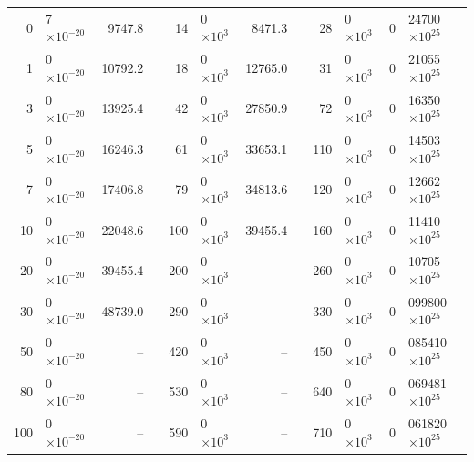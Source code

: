 \documentclass{warpdoc}
\begin{document}
\begin{table}
\begin{threeparttable}
\begin{tabular}{r@{.}lr@{}lr@{.}lr@{}lr@{.}lr@{.}l}
      0&7 $\times 10^{-20}$  &9747.8&  & 14&0 $\times 10^{3}$ &8471.3& & 28&0 $\times 10^{3}$ &  0&24700 $\times 10^{25}$\\
     1&0 $\times 10^{-20}$  &10792.2& & 18&0 $\times 10^{3}$ &12765.0& & 31&0 $\times 10^{3}$ &  0&21055 $\times 10^{25}$ \\
     3&0 $\times 10^{-20}$  &13925.4& & 42&0 $\times 10^{3}$ &27850.9& & 72&0 $\times 10^{3}$ &  0&16350 $\times 10^{25}$ \\
     5&0 $\times 10^{-20}$  &16246.3& & 61&0 $\times 10^{3}$ &33653.1& &110&0 $\times 10^{3}$ &  0&14503 $\times 10^{25}$ \\
     7&0 $\times 10^{-20}$  &17406.8& & 79&0 $\times 10^{3}$ &34813.6& &120&0 $\times 10^{3}$ &  0&12662 $\times 10^{25}$ \\
    10&0 $\times 10^{-20}$ &22048.6& &100&0 $\times 10^{3}$ &39455.4& &160&0 $\times 10^{3}$ &  0&11410 $\times 10^{25}$  \\
    20&0 $\times 10^{-20}$ &39455.4& &200&0 $\times 10^{3}$ &--& &260&0 $\times 10^{3}$ &  0&10705 $\times 10^{25}$  \\
    30&0 $\times 10^{-20}$ &48739.0& &290&0 $\times 10^{3}$ &--& &330&0 $\times 10^{3}$ &  0&099800 $\times 10^{25}$  \\
    50&0 $\times 10^{-20}$ &--& &420&0 $\times 10^{3}$ &--& &450&0 $\times 10^{3}$ &  0&085410 $\times 10^{25}$  \\
    80&0 $\times 10^{-20}$ &--& &530&0 $\times 10^{3}$ &--& &640&0 $\times 10^{3}$ &  0&069481 $\times 10^{25}$  \\
   100&0 $\times 10^{-20}$ &--& &590&0 $\times 10^{3}$ &--& &710&0 $\times 10^{3}$ &  0&061820 $\times 10^{25}$   \\             
    \bottomrule
    \end{tabular}
   \end{threeparttable}
\end{table}
%
\end{document}
